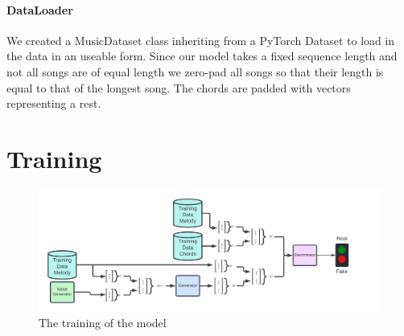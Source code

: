 \paragraph{DataLoader} 
We created a MusicDataset class inheriting from a PyTorch Dataset to load in the data in an useable form.
Since our model takes a fixed sequence length and not all songs are of equal length we zero-pad all songs so that their length is equal to that of the longest song.
The chords are padded with vectors representing a rest.

\section{Training}

\begin{figure}
    \centering
    \includegraphics[width=\columnwidth]{Figures/GAN}
    \decoRule
    \caption{The training of the model}
    \label{fig:ModelTraining}
\end{figure}

